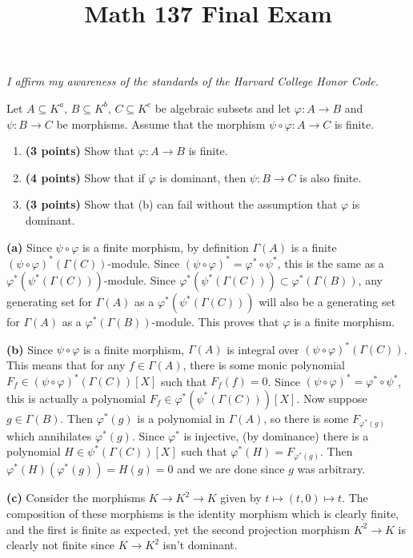 \documentclass[11pt,letterpaper]{article}
\title{\textbf{Math 137 Final Exam}}
\begin{document}
\maketitle

\begin{center}
    \textit{I affirm my awareness of the standards of the Harvard College Honor Code.}
\end{center}

\begin{problem}
    Let $A\subseteq K^a$, $B\subseteq K^b$, $C\subseteq K^c$ be algebraic subsets and let $\varphi:A\rightarrow B$ and $\psi:B\rightarrow C$ be morphisms. Assume that the morphism $\psi\circ\varphi:A\rightarrow C$ is finite.
    \begin{enumerate}[label=(\alph*)]
        \item \textbf{(3 points)} Show that $\varphi:A\rightarrow B$ is finite.
        \item \textbf{(4 points)} Show that if $\varphi$ is dominant, then $\psi:B\rightarrow C$ is also finite.
        \item \textbf{(3 points)} Show that (b) can fail without the assumption that $\varphi$ is dominant.
    \end{enumerate}
\end{problem}

\begin{solution}
    \textbf{(a)} Since $\psi\circ \varphi$ is a finite morphism, by definition $\Gamma(A)$ is a finite $(\psi\circ\varphi)^*(\Gamma(C))$-module. Since $(\psi\circ \varphi)^*=\varphi^*\circ\psi^*$, this is the same as a $\varphi^*(\psi^*(\Gamma(C)))$-module. Since $\varphi^*(\psi^*(\Gamma(C)))\subset \varphi^*(\Gamma(B))$, any generating set for $\Gamma(A)$ as a $\varphi^*(\psi^*(\Gamma(C)))$ will also be a generating set for $\Gamma(A)$ as a $\varphi^*(\Gamma(B))$-module. This proves that $\varphi$ is a finite morphism.

    \textbf{(b)} Since $\psi\circ \varphi$ is a finite morphism, $\Gamma(A)$ is integral over $(\psi\circ\varphi)^*(\Gamma(C))$. This means that for any $f\in \Gamma(A)$, there is some monic polynomial $F_f\in (\psi\circ\varphi)^*(\Gamma(C))[X]$ such that $F_f(f)=0$. Since $(\psi\circ\varphi)^* = \varphi^*\circ \psi^*$, this is actually a polynomial $F_f\in \varphi^*(\psi^*(\Gamma(C)))[X]$. Now suppose $g\in \Gamma(B)$. Then $\varphi^*(g)$ is a polynomial in $\Gamma(A)$, so there is some $F_{\varphi^*(g)}$ which annihilates $\varphi^*(g)$. Since $\varphi^*$ is injective, (by dominance) there is a polynomial $H\in \psi^*(\Gamma(C))[X]$ such that $\varphi^*(H)=F_{\varphi^*(g)}$. Then $\varphi^*(H)(\varphi^*(g))=H(g)=0$ and we are done since $g$ was arbitrary.

    \textbf{(c)} Consider the morphisms $K \to K^2 \to K$ given by $t \mapsto (t,0) \mapsto t$. The composition of these morphisms is the identity morphism which is clearly finite, and the first is finite as expected, yet the second projection morphism $K^2\to K$ is clearly not finite since $K\to K^2$ isn't dominant.
\end{solution}
\end{document}
